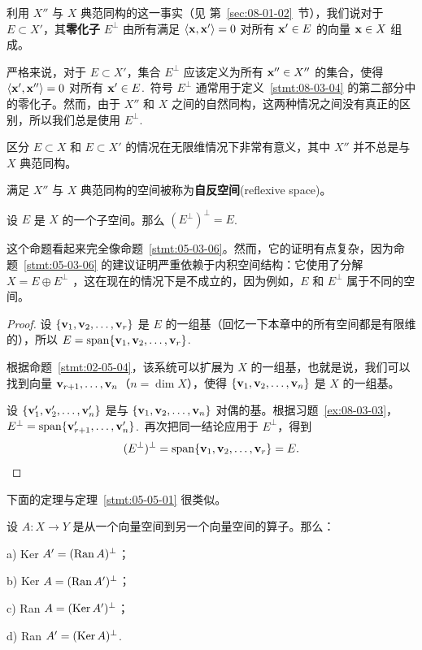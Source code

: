 利用 $X''$ 与 $X$ 典范同构的这一事实（见 第~\ref{sec:08-01-02}~节），我们说对于 $E \subset X'$，其\textbf{零化子} $E^\perp$ 由所有满足 $\langle \mathbf{x}, \mathbf{x}' \rangle = 0$ 对所有 $\mathbf{x}' \in E$ 的向量 $\mathbf{x} \in X$ 组成。

\begin{remark}\label{stmt:08-03-05}
严格来说，对于 $E \subset X'$，集合 $E^\perp$ 应该定义为所有 $\mathbf{x}'' \in X''$ 的集合，使得 $\langle \mathbf{x}', \mathbf{x}'' \rangle = 0$ 对所有 $\mathbf{x}' \in E$.~符号 $E^\perp$ 通常用于定义~\ref{stmt:08-03-04} 的第二部分中的零化子。然而，由于 $X''$ 和 $X$ 之间的自然同构，这两种情况之间没有真正的区别，所以我们总是使用 $E^\perp$.~
\end{remark}

区分 $E \subset X$ 和 $E \subset X'$ 的情况在无限维情况下非常有意义，其中 $X''$ 并不总是与 $X$ 典范同构。

满足 $X''$ 与 $X$ 典范同构的空间被称为\textbf{自反空间}(reflexive space)。

\begin{proposition}\label{stmt:08-03-06}
设 $E$ 是 $X$ 的一个子空间。那么 $(E^\perp)^\perp = E$.~
\end{proposition}

这个命题看起来完全像命题~\ref{stmt:05-03-06}。然而，它的证明有点复杂，因为命题~\ref{stmt:05-03-06} 的建议证明严重依赖于内积空间结构：它使用了分解 $X = E \oplus E^\perp$ ，这在现在的情况下是不成立的，因为例如，$E$ 和 $E^\perp$ 属于不同的空间。

\begin{proof}
设 $\{\mathbf{v}_1, \mathbf{v}_2, \dots, \mathbf{v}_r\}$ 是 $E$ 的一组基（回忆一下本章中的所有空间都是有限维的），所以 $E = \operatorname{span}\{\mathbf{v}_1, \mathbf{v}_2, \dots, \mathbf{v}_r\}$.~

根据命题~\ref{stmt:02-05-04}，该系统可以扩展为 $X$ 的一组基，也就是说，我们可以找到向量 $\mathbf{v}_{r+1}, \dots, \mathbf{v}_n$（$n = \dim X$），使得 $\{\mathbf{v}_1, \mathbf{v}_2, \dots, \mathbf{v}_n\}$ 是 $X$ 的一组基。

设 $\{\mathbf{v}'_1, \mathbf{v}'_2, \dots, \mathbf{v}'_n\}$ 是与 $\{\mathbf{v}_1, \mathbf{v}_2, \dots, \mathbf{v}_n\}$ 对偶的基。根据习题~\ref{ex:08-03-03}，$E^\perp = \operatorname{span}\{\mathbf{v}'_{r+1}, \dots, \mathbf{v}'_n\}$.~再次把同一结论应用于 $E^\perp$，得到
$$(E^\perp)^\perp = \operatorname{span}\{\mathbf{v}_1, \mathbf{v}_2, \dots, \mathbf{v}_r\}=E.$$\end{proof}

下面的定理与定理~\ref{stmt:05-05-01} 很类似。

\begin{theorem}\label{stmt:08-03-07}
设 $A : X \to Y$ 是从一个向量空间到另一个向量空间的算子。那么：

a) Ker $A' = (\operatorname{Ran} A)^\perp$；

b) Ker $A = (\operatorname{Ran} A')^\perp$；

c) Ran $A = (\operatorname{Ker} A')^\perp$；

d) Ran $A' = (\operatorname{Ker} A)^\perp$.~\end{theorem}

